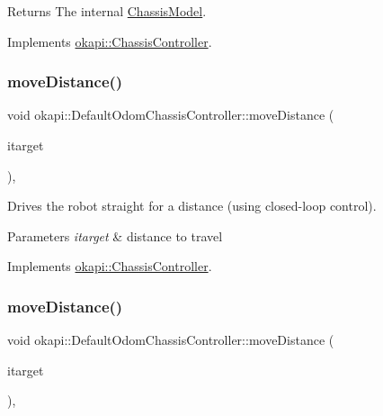 \begin{DoxyReturn}{Returns}
The internal \mbox{\hyperlink{classokapi_1_1ChassisModel}{Chassis\+Model}}. 
\end{DoxyReturn}


Implements \mbox{\hyperlink{classokapi_1_1ChassisController_a239802eda7e4317a65d1a04994f7b97e}{okapi\+::\+Chassis\+Controller}}.

\mbox{\label{classokapi_1_1DefaultOdomChassisController_a3143bc60f72ab8ff8f63aad9a810a1c6}} 
\subsubsection{\texorpdfstring{moveDistance()}{moveDistance()}\hspace{0.1cm}{\footnotesize\ttfamily [1/2]}}
{\footnotesize\ttfamily void okapi\+::\+Default\+Odom\+Chassis\+Controller\+::move\+Distance (\begin{DoxyParamCaption}\item[{Q\+Length}]{itarget }\end{DoxyParamCaption})\hspace{0.3cm}{\ttfamily [override]}, {\ttfamily [virtual]}}

Drives the robot straight for a distance (using closed-\/loop control).


\begin{DoxyParams}{Parameters}
{\em itarget} & distance to travel \\
\hline
\end{DoxyParams}


Implements \mbox{\hyperlink{classokapi_1_1ChassisController_a6d5b69139dfa8b814d05c74c22bcaa43}{okapi\+::\+Chassis\+Controller}}.

\mbox{\label{classokapi_1_1DefaultOdomChassisController_a42abd53b9a0b96b722186ada8eb13d98}} 
\subsubsection{\texorpdfstring{moveDistance()}{moveDistance()}\hspace{0.1cm}{\footnotesize\ttfamily [2/2]}}
{\footnotesize\ttfamily void okapi\+::\+Default\+Odom\+Chassis\+Controller\+::move\+Distance (\begin{DoxyParamCaption}\item[{double}]{itarget }\end{DoxyParamCaption})\hspace{0.3cm}{\ttfamily [override]}, {\ttfamily [virtual]}}


